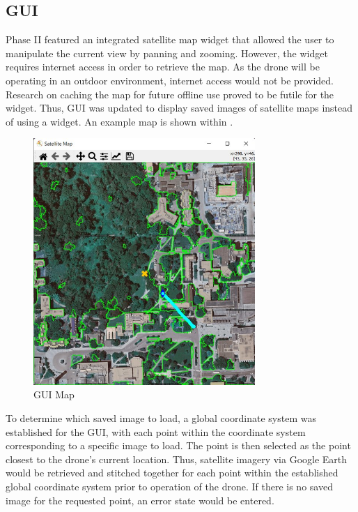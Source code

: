 \documentclass{article}
\begin{document}
\clearpage

\subsection{GUI}
\label{subsec:GUI}
Phase II featured an integrated satellite map widget that allowed the user to manipulate the current view by panning and zooming. However, the widget requires internet access in order to retrieve the map. As the drone will be operating in an outdoor environment, internet access would not be provided.
Research on caching the map for future offline use proved to be futile for the widget.
Thus, GUI was updated to display saved images of satellite maps instead of using a widget.
An example map is shown within .

\begin{figure}[h!]
  \begin{center} 
  \caption{GUI Map}
  \label{fig:guiMap}
        \includegraphics[width=0.75\textwidth]{Reflection/GUIMap.png}
  \end{center}
\end{figure}

\clearpage

To determine which saved image to load, a global coordinate system was established for the GUI, with each point within the coordinate system corresponding to a specific image to load. The point is then selected as the point closest to the drone's current location. Thus, satellite imagery via Google Earth would be retrieved and stitched together for each point within the established global coordinate system prior to operation of the drone. If there is no saved image for the requested point, an error state would be entered.
\end{document}
